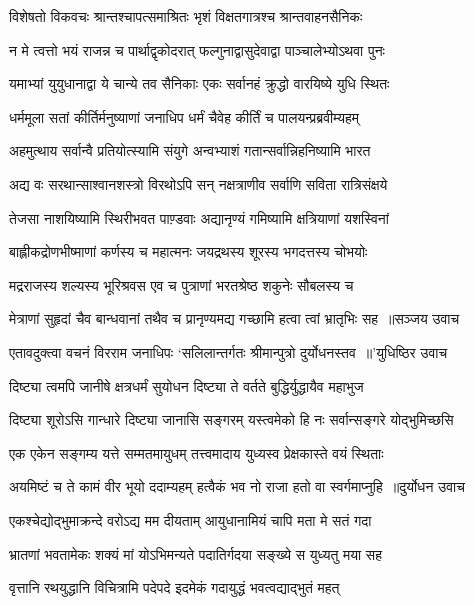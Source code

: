 \twolineshloka
{विशेषतो विकवचः श्रान्तश्चापत्समाश्रितः}
{भृशं विक्षतगात्रश्च श्रान्तवाहनसैनिकः}


\twolineshloka
{न मे त्वत्तो भयं राजन्न च पार्थाद्वृकोदरात्}
{फल्गुनाद्वासुदेवाद्वा पाञ्चालेभ्योऽथवा पुनः}


\twolineshloka
{यमाभ्यां युयुधानाद्वा ये चान्ये तव सैनिकाः}
{एकः सर्वानहं क्रुद्धो वारयिष्ये युधि स्थितः}


\twolineshloka
{धर्ममूला सतां कीर्तिर्मनुष्याणां जनाधिप}
{धर्मं चैवेह कीर्तिं च पालयन्प्रब्रवीम्यहम्}


\twolineshloka
{अहमुत्थाय सर्वान्वै प्रतियोत्स्यामि संयुगे}
{अन्वभ्याशं गतान्सर्वान्निहनिष्यामि भारत}


\twolineshloka
{अद्य वः सरथान्साश्वानशस्त्रो विरथोऽपि सन्}
{नक्षत्राणीव सर्वाणि सविता रात्रिसंक्षये}


\twolineshloka
{तेजसा नाशयिष्यामि स्थिरीभवत पाण़्डवाः}
{अद्यानृण्यं गमिष्यामि क्षत्रियाणां यशस्विनां}


\twolineshloka
{बाह्लीकद्रोणभीष्माणां कर्णस्य च महात्मनः}
{जयद्रथस्य शूरस्य भगदत्तस्य चोभयोः}


\twolineshloka
{मद्रराजस्य शल्यस्य भूरिश्रवस एव च}
{पुत्राणां भरतश्रेष्ठ शकुनेः सौबलस्य च}


\threelineshloka
{मेत्राणां सुहृदां चैव बान्धवानां तथैव च}
{प्रानृण्यमद्य गच्छामि हत्वा त्वां भ्रातृभिः सह ॥सञ्जय उवाच}
{}


\threelineshloka
{एतावदुक्त्वा वचनं विरराम जनाधिपः}
{`सलिलान्तर्गतः श्रीमान्पुत्रो दुर्योधनस्तव ॥'युधिष्ठिर उवाच}
{}


\twolineshloka
{दिष्ट्या त्वमपि जानीषे क्षत्रधर्मं सुयोधन}
{दिष्ट्या ते वर्तते बुद्धिर्युद्धायैव महाभुज}


\twolineshloka
{दिष्ट्या शूरोऽसि गान्धारे दिष्ट्या जानासि सङ्गरम्}
{यस्त्वमेको हि नः सर्वान्सङ्गरे योद्भुमिच्छसि}


\twolineshloka
{एक एकेन सङ्गम्य यत्ते सम्मतमायुधम्}
{तत्त्वमादाय युध्यस्व प्रेक्षकास्ते वयं स्थिताः}


\threelineshloka
{अयमिष्टं च ते कामं वीर भूयो ददाम्यहम्}
{हत्वैकं भव नो राजा हतो वा स्वर्गमाप्नुहि ॥दुर्योधन उवाच}
{}


\twolineshloka
{एकश्चेद्योद्भुमाक्रन्दे वरोऽद्य मम दीयताम्}
{आयुधानामियं चापि मता मे सतं गदा}


\twolineshloka
{भ्रातणां भवतामेकः शक्यं मां योऽभिमन्यते}
{पदातिर्गदया सङ्ख्ये स युध्यतु मया सह}


\twolineshloka
{वृत्तानि रथयुद्धानि विचित्रामि पदेपदे}
{इदमेकं गदायुद्धं भवत्वद्याद्भुतं महत्}


